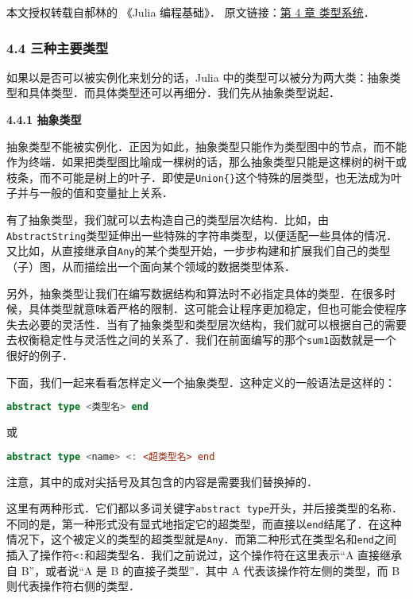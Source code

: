 
本文授权转载自郝林的 《Julia 编程基础》． 原文链接：\href{https://github.com/hyper0x/JuliaBasics/blob/master/book/ch04.md}{第 4 章 类型系统}．


\subsubsection{4.4 三种主要类型}

如果以是否可以被实例化来划分的话，Julia 中的类型可以被分为两大类：抽象类型和具体类型．而具体类型还可以再细分．我们先从抽象类型说起．

\textbf{4.4.1 抽象类型}

抽象类型不能被实例化．正因为如此，抽象类型只能作为类型图中的节点，而不能作为终端．如果把类型图比喻成一棵树的话，那么抽象类型只能是这棵树的树干或枝条，而不可能是树上的叶子．即使是\verb|Union{}|这个特殊的层类型，也无法成为叶子并与一般的值和变量扯上关系．

有了抽象类型，我们就可以去构造自己的类型层次结构．比如，由\verb|AbstractString|类型延伸出一些特殊的字符串类型，以便适配一些具体的情况．又比如，从直接继承自\verb|Any|的某个类型开始，一步步构建和扩展我们自己的类型（子）图，从而描绘出一个面向某个领域的数据类型体系．

另外，抽象类型让我们在编写数据结构和算法时不必指定具体的类型．在很多时候，具体类型就意味着严格的限制．这可能会让程序更加稳定，但也可能会使程序失去必要的灵活性．当有了抽象类型和类型层次结构，我们就可以根据自己的需要去权衡稳定性与灵活性之间的关系了．我们在前面编写的那个\verb|sum1|函数就是一个很好的例子．

下面，我们一起来看看怎样定义一个抽象类型．这种定义的一般语法是这样的：

\begin{lstlisting}[language=julia]
abstract type <类型名> end 
\end{lstlisting}

或

\begin{lstlisting}[language=julia]
abstract type <name> <: <超类型名> end
\end{lstlisting}

注意，其中的成对尖括号及其包含的内容是需要我们替换掉的．

这里有两种形式．它们都以多词关键字\verb|abstract type|开头，并后接类型的名称．不同的是，第一种形式没有显式地指定它的超类型，而直接以\verb|end|结尾了．在这种情况下，这个被定义的类型的超类型就是\verb|Any|．而第二种形式在类型名和\verb|end|之间插入了操作符\verb|<:|和超类型名．我们之前说过，这个操作符在这里表示“A 直接继承自 B”，或者说“A 是 B 的直接子类型”．其中 A 代表该操作符左侧的类型，而 B 则代表操作符右侧的类型．

